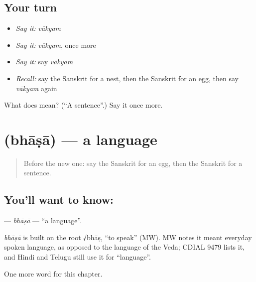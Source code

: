 \subsection*{Your turn}
\begin{itemize}
\raggedright
  \item \emph{Say it:} \emph{vākyam}
  \item \emph{Say it:} \emph{vākyam}, once more
  \item \emph{Say it:} say \emph{vākyam}
  \item \emph{Recall:} say the Sanskrit for a nest, then the Sanskrit for an egg, then say \emph{vākyam} again
\end{itemize}

\begin{tcolorbox}[breakable,colback=teal!4,colframe=teal!35!black,title={Before you move on}]
What does  mean? (\textquotedblleft{}A sentence\textquotedblright{}.) Say it once more.
\end{tcolorbox}
\section[\texorpdfstring{\sk{भाषा} (bhāṣā)}{भाषा (bhāṣā)}]{ (bhāṣā) — a language}

\label{lesson:SA-C199-bhasa}



\begin{quote}
Before the new one: say the Sanskrit for an egg, then the Sanskrit for a sentence.
\end{quote}

\subsection*{You'll want to know: }
\textbf{} — \emph{bhāṣā} — \textquotedblleft{}a language\textquotedblright{}.

\begin{cousinweb}
\emph{bhāṣā} is built on the root √bhāṣ, \textquotedblleft{}to speak\textquotedblright{} (MW). MW notes it meant everyday spoken language, as opposed to the language of the Veda; CDIAL 9479 lists it, and Hindi and Telugu still use it for \textquotedblleft{}language\textquotedblright{}.
\end{cousinweb}

\begin{grammarlens}[title={What you've built}]
One more word for this chapter.
\end{grammarlens}

